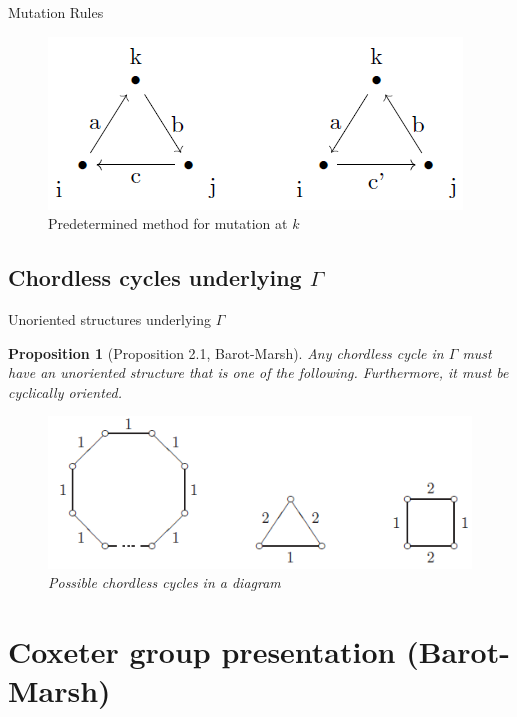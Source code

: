 \documentclass{beamer}
\newtheorem{proposition}{Proposition}
\begin{document}
\begin{frame}{Mutation Rules}
\begin{figure}[h]
\centering
\includegraphics[scale = .65]{mutationrules.PNG}
\caption{Predetermined method for mutation at $k$}
\end{figure}
\end{frame}

\subsection{Chordless cycles underlying $\Gamma$}

\begin{frame}{Unoriented structures underlying $\Gamma$}
\begin{proposition}
[Proposition 2.1, Barot-Marsh]
Any chordless cycle in $\Gamma$ must have an unoriented structure that is one of the following. Furthermore, it must be cyclically oriented.
\begin{figure}[h]
\centering
\includegraphics[scale = .65]{chordlesscycles.PNG}
\caption{Possible chordless cycles in a diagram}
\end{figure}

\end{proposition}
\end{frame}


\section{Coxeter group presentation (Barot-Marsh)}
\end{document}
